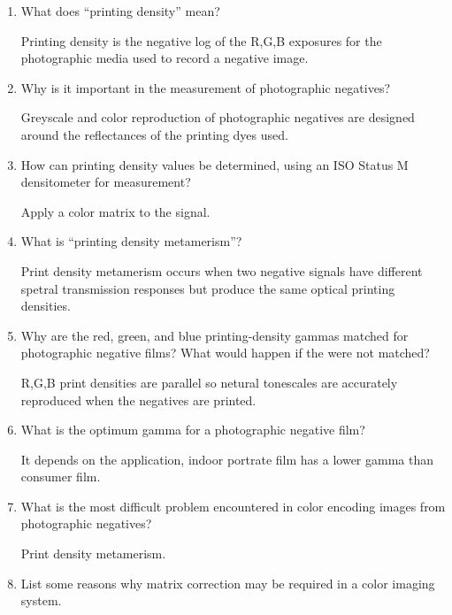 \begin{enumerate}
 \item
  What does “printing density” mean? \newline
 \par Printing density is the negative log of the R,G,B exposures for the photographic media used to record a negative image. \newline
 \item
  Why is it important in the measurement of photographic negatives? \newline
 \par Greyscale and color reproduction of photographic negatives are designed around the reflectances of the printing dyes used. \newline
 \item
  How can printing density values be determined, using an ISO Status M densitometer for measurement? \newline
 \par Apply a color matrix to the signal. \newline
 \item
  What is “printing density metamerism”? \newline
 \par Print density metamerism occurs when two negative signals have different spetral transmission responses but produce the same optical printing densities. \newline
 \item
  Why are the red, green, and blue printing-density gammas matched for photographic negative films? What would happen if the were not matched? \newline
 \par R,G,B print densities are parallel so netural tonescales are accurately reproduced when the negatives are printed. \newline
 \item
  What is the optimum gamma for a photographic negative film? \newline
 \par It depends on the application, indoor portrate film has a lower gamma than consumer film. \newline
 \item
 What is the most difficult problem encountered in color encoding images from photographic negatives? \newline
 \par Print density metamerism.
 \item
 List some reasons why matrix correction may be required in a color imaging system. \newline

\end{enumerate}
